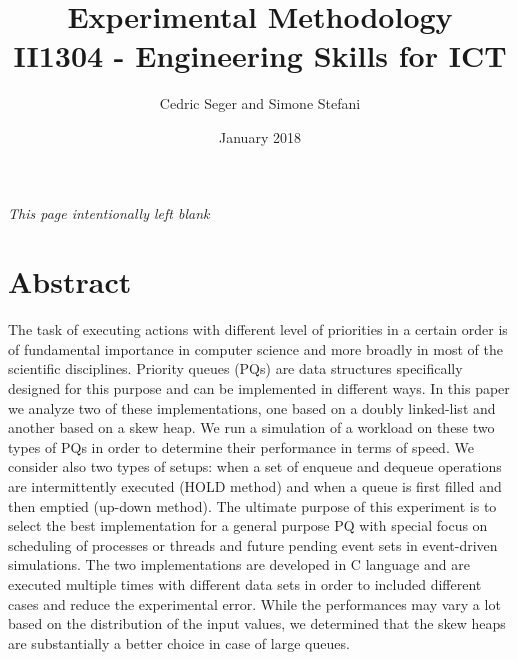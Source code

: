 \documentclass{article}
\begin{document}

\title{
    \textbf{Experimental Methodology}\\
    \large{II1304 - Engineering Skills for ICT}
    }
\author{Cedric Seger and Simone Stefani}
\date{January 2018}
\maketitle
\thispagestyle{fancy}

\pagebreak

{\centering
\textit{This page intentionally left blank}\par
}
\pagebreak



\section*{Abstract}
The task of executing actions with different level of priorities in a certain order is of fundamental importance in computer science and more broadly in most of the scientific disciplines. Priority queues (PQs) are data structures specifically designed for this purpose and can be implemented in different ways. In this paper we analyze two of these implementations, one based on a doubly linked-list and another based on a skew heap. We run a simulation of a workload on these two types of PQs in order to determine their performance in terms of speed. We consider also two types of setups: when a set of enqueue and dequeue operations are intermittently executed (HOLD method) and when a queue is first filled and then emptied (up-down method). The ultimate purpose of this experiment is to select the best implementation for a general purpose PQ with special focus on scheduling of processes or threads and future pending event sets in event-driven simulations. The two implementations are developed in C language and are executed multiple times with different data sets in order to included different cases and reduce the experimental error. While the performances may vary a lot based on the distribution of the input values, we determined that the skew heaps are substantially a better choice in case of large queues.

\pagebreak


\end{document}
